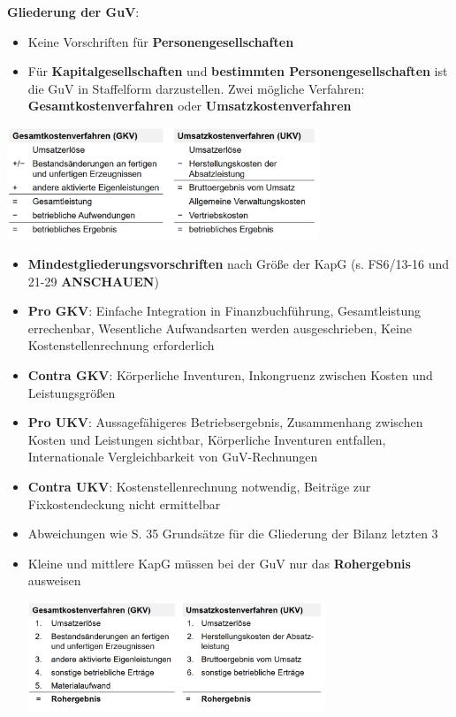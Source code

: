 \textbf{Gliederung der GuV}:
\begin{itemize}
	\item Keine Vorschriften für \textbf{Personengesellschaften}
	\item Für \textbf{Kapitalgesellschaften} und \textbf{bestimmten Personengesellschaften} ist die GuV in Staffelform darzustellen. Zwei mögliche Verfahren: \textbf{Gesamtkostenverfahren} oder \textbf{Umsatzkostenverfahren}
\end{itemize}
\begin{center}
	\includegraphics[width=0.7\textwidth]{images/gkvukv.png}
\end{center}
\begin{itemize}
	\item \textbf{Mindestgliederungsvorschriften} nach Größe der KapG (s. FS6/13-16 und 21-29 \textbf{ANSCHAUEN})
	\item \textbf{Pro GKV}: Einfache Integration in Finanzbuchführung,  Gesamtleistung errechenbar,
	Wesentliche Aufwandsarten werden ausgeschrieben,  Keine Kostenstellenrechnung erforderlich
	\item \textbf{Contra GKV}: Körperliche Inventuren, Inkongruenz zwischen Kosten und Leistungsgrößen
	\item \textbf{Pro UKV}: Aussagefähigeres Betriebsergebnis, Zusammenhang zwischen Kosten und Leistungen sichtbar, Körperliche Inventuren entfallen, Internationale Vergleichbarkeit von GuV-Rechnungen
	\item \textbf{Contra UKV}: Kostenstellenrechnung notwendig, Beiträge zur Fixkostendeckung nicht ermittelbar
	\item Abweichungen wie S. 35 Grundsätze für die Gliederung der Bilanz letzten 3 
	\item Kleine und mittlere KapG müssen bei der GuV nur das \textbf{Rohergebnis} ausweisen
	\begin{center}
		\includegraphics[width=0.7\textwidth]{images/roh.png}
	\end{center}
\end{itemize}

